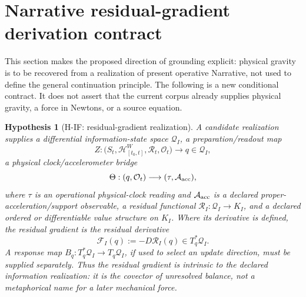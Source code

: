 \documentclass[11pt,a4paper]{article}
\newtheorem{hypothesis}[definition]{Hypothesis}
\theoremstyle{remark}
\newcommand{\Hist}{\mathcal H}
\newcommand{\Obs}{\mathcal O}
\begin{document}
\section{Narrative residual-gradient derivation contract}\label{sec:informationforce}
This section makes the proposed direction of grounding explicit: physical gravity
is to be recovered from a realization of present operative Narrative, not used
to define the general continuation principle. The following is a new conditional
contract. It does not assert that the current corpus already supplies physical
gravity, a force in Newtons, or a source equation.

\begin{hypothesis}[H-IF: residual-gradient realization]\label{hyp:informationforce}
A candidate realization supplies a differential information-state space
$\mathcal Q_I$, a preparation/readout map
\[
 Z:\bigl(S_t,\Hist^W_{[t_0,t]},\mathcal R_t,\Obs_t\bigr)
 \longrightarrow q\in\mathcal Q_I,
\]
a physical clock/accelerometer bridge
\[
 \Theta:(q,\Obs_t)\longrightarrow(\tau,\mathcal A_{\rm acc}),
\]
where $\tau$ is an operational physical-clock reading and
$\mathcal A_{\rm acc}$ is a declared proper-acceleration/support observable,
a residual functional $\mathcal R_I:\mathcal Q_I\to K_I$, and a declared
ordered or differentiable value structure on $K_I$. Where its derivative is
defined, the \emph{residual gradient} is the residual derivative
\[
 \boxed{\mathcal F_I(q):=-D\mathcal R_I(q)\in T_q^*\mathcal Q_I.}\tag{IF1}
\]
A response map $B_q:T_q^*\mathcal Q_I\to T_q\mathcal Q_I$, if used to select
an update direction, must be supplied separately. Thus the residual gradient is
intrinsic to the declared information realization: it is the covector of
unresolved balance, not a metaphorical name for a later mechanical force.
\end{hypothesis}
\end{document}
